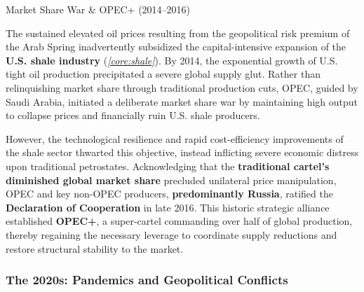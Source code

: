 \documentclass[10pt]{article}
\begin{document}
      \begin{core}[label=core:market_war]{Market Share War \& OPEC+ (2014--2016)}

        The sustained elevated oil prices resulting from the geopolitical risk premium of the Arab Spring inadvertently subsidized the capital-intensive expansion of the \textbf{U.S. shale industry} (\textit{\autoref{core:shale}}). By 2014, the exponential growth of U.S. tight oil production precipitated a severe global supply glut. Rather than relinquishing market share through traditional production cuts, OPEC, guided by Saudi Arabia, initiated a deliberate market share war by maintaining high output to collapse prices and financially ruin U.S. shale producers.


        However, the technological resilience and rapid cost-efficiency improvements of the shale sector thwarted this objective, instead inflicting severe economic distress upon traditional petrostates. Acknowledging that the \textbf{traditional cartel's diminished global market share} precluded unilateral price manipulation, OPEC and key non-OPEC producers, \textbf{predominantly Russia}, ratified the \textbf{Declaration of Cooperation} in late 2016. This historic strategic alliance established \textbf{OPEC+}, a super-cartel commanding over half of global production, thereby regaining the necessary leverage to coordinate supply reductions and restore structural stability to the market.

      \end{core}



    \subsubsection{The 2020s: Pandemics and Geopolitical Conflicts}
\end{document}
